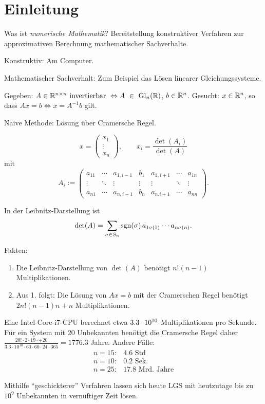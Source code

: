\section{Einleitung}
Was ist \emph{numerische Mathematik}? Bereitstellung konstruktiver Verfahren zur approximativen Berechnung mathematischer Sachverhalte.

Konstruktiv: Am Computer.

Mathematischer Sachverhalt: Zum Beispiel das Lösen linearer Gleichungssysteme.

\begin{Beispiel}

Gegeben: $A \in \mathbb R^{n\times n} \text{ invertierbar } \Leftrightarrow A~\in~\mathrm{Gl}_n(\mathbb R)$,
$b \in \mathbb R^n$.
Gesucht: $x \in \mathbb R^n$, so dass $Ax = b \Leftrightarrow x = A^{-1} b$ gilt.

Naive Methode: Lösung über Cramersche Regel.

$$x = \begin{pmatrix}x_1 \\ \vdots \\ x_n \end{pmatrix}, \qquad x_i = \frac{\det(A_i)}{\det(A)}$$
mit $$A_i :=
\begin{pmatrix}
  a_{11} & \cdots & a_{1,i-1} & b_1 & a_{1,i+1} & \cdots & a_{1n} \\
  \vdots & \ddots & \vdots & \vdots & \vdots & \ddots & \vdots \\
  a_{n1} & \cdots & a_{n,i-1} & b_n & a_{n.i+1} & \cdots & a_{nn}
\end{pmatrix}.$$

In der Leibnitz-Darstellung ist $$\det(A) = \sum_{\sigma\in S_n} \operatorname*{\mathrm{sgn}}(\sigma)\, a_{1\sigma(1)} \cdots a_{n\sigma(n)}.$$

Fakten:
\begin{enumerate}
\item Die Leibnitz-Darstellung von $\det(A)$ benötigt $n! (n-1)$ Multiplikationen.
\item Aus 1. folgt: Die Lösung von $Ax=b$ mit der Cramerschen Regel benötigt $2n!(n-1)n + n$
      Multiplikationen.
\end{enumerate}

Eine Intel-Core-i7-CPU berechnet etwa $3.3\cdot 10^{10}$ Multiplikationen pro Sekunde.
Für ein System mit 20 Unbekannten benötigt die Cramersche Regel daher
$ \frac{20! \cdot 2 \cdot 19 \cdot +20}{3.3 \cdot 10^{10}
\cdot 60 \cdot 60 \cdot 24 \cdot 365} = 1776.3$ Jahre.
Andere Fälle:
\begin{align*}
n = 15\colon & 4.6\text{ Std}\\
n = 10\colon & 0.2\text{ Sek.}\\
n = 25\colon & 17.8\text{ Mrd. Jahre}
\end{align*}

Mithilfe "`geschickterer"' Verfahren lassen sich heute LGS mit heutzutage bis zu $10^9$
Unbekannten in vernüftiger Zeit lösen.
\end{Beispiel}

